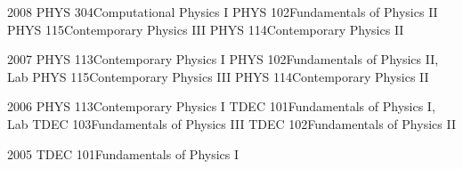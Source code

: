 \documentclass[]{scrartcl}
\begin{document}
\begin{cleanCV}
\Teaching
{2008}
{PHYS 304}{Computational Physics I\TeachingNote}
\Teaching
{}
{PHYS 102}{Fundamentals of Physics II\TeachingNote}
\Teaching
{}
{PHYS 115}{Contemporary Physics III\TeachingNote}
\Teaching
{}
{PHYS 114}{Contemporary Physics II\TeachingNote}

\Teaching
{2007}
{PHYS 113}{Contemporary Physics I\TeachingNote}
\Teaching
{}
{PHYS 102}{Fundamentals of Physics II, Lab}
\Teaching
{}
{PHYS 115}{Contemporary Physics III\TeachingNote}
\Teaching
{}
{PHYS 114}{Contemporary Physics II\TeachingNote}

\Teaching
{2006}
{PHYS 113}{Contemporary Physics I\TeachingNote}
\Teaching
{}
{TDEC 101}{Fundamentals of Physics I, Lab}
\Teaching
{}
{TDEC 103}{Fundamentals of Physics III\TeachingNote}
\Teaching
{}
{TDEC 102}{Fundamentals of Physics II\TeachingNote}

\Teaching
{2005}
{TDEC 101}{Fundamentals of Physics I\TeachingNote}


\end{cleanCV}
\end{document}
